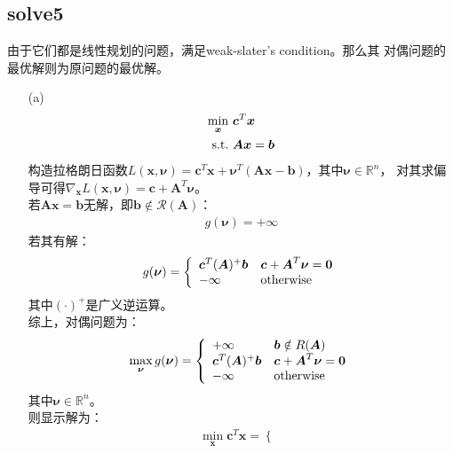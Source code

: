 \documentclass[12pt,a4paper]{ctexart}
\begin{document}
\subsection*{solve5}
由于它们都是线性规划的问题，满足weak-slater's condition。那么其
对偶问题的最优解则为原问题的最优解。
\begin{itemize}
\item[(a)] 
\begin{align*}
    \min\limits_{\boldsymbol{x}} \ &\boldsymbol{c}^T\boldsymbol{x} \\
    \rm{s.t.}\  &\boldsymbol{Ax}=\boldsymbol{b}
\end{align*}
构造拉格朗日函数$L(\boldsymbol{x},\boldsymbol{\nu})=
\boldsymbol{c}^T\boldsymbol{x}+\boldsymbol{\nu}^T(\boldsymbol{Ax}-\boldsymbol{b})$，其中$\boldsymbol{\nu} \in \mathbb{R}^n$，
对其求偏导可得$\nabla_{\boldsymbol{x}} L(\boldsymbol{x},\boldsymbol{\nu})=\boldsymbol{c}+\boldsymbol{ A}^T \boldsymbol{\nu}$。\\
若$\boldsymbol{Ax}=\boldsymbol{b}$无解，即$\boldsymbol{b} \notin \mathcal{R}(\boldsymbol{A})$：
\begin{align*}
g(\boldsymbol{\nu})=+\infty
\end{align*}
若其有解：
\begin{align*}
g(\boldsymbol{\nu})=\left \{
\begin{array}{ll}
\boldsymbol{c}^T (\boldsymbol{A})^{+}\boldsymbol{b} &\boldsymbol{c}+\boldsymbol{A}^T \boldsymbol{\nu}=\boldsymbol{0}\\
-\infty &\rm{otherwise}
\end{array}
\right.
\end{align*}
其中$(\cdot)^+$是广义逆运算。\\
综上，对偶问题为：
\begin{align*}
    \max\limits_{\boldsymbol{\nu}} g(\boldsymbol{\nu})=\left \{
    \begin{array}{ll}
    +\infty &\boldsymbol{b} \notin R(\boldsymbol{A})\\
    \boldsymbol{c}^T (\boldsymbol{A})^{+}\boldsymbol{b} &\boldsymbol{c}+\boldsymbol{A}^T \boldsymbol{\nu}=\boldsymbol{0}\\
    -\infty &\rm{otherwise}
    \end{array}
    \right.
    \end{align*}
其中$\boldsymbol{\nu}\in \mathbb{R}^n$。\\
则显示解为：
\begin{align*}
    \min\limits_{\boldsymbol{x}} \boldsymbol{c}^T\boldsymbol{x}
    =\left \{
    \begin{array}{ll}

\end{array}
\end{align*}
\end{itemize}
\end{document}
